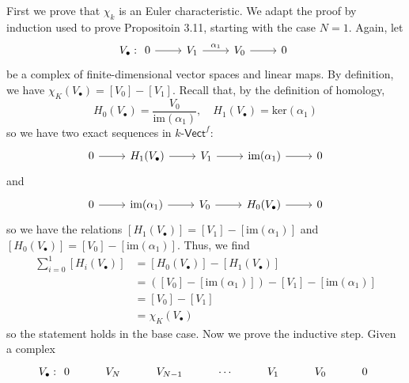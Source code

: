 \documentclass[../../master.tex]{subfiles}
\begin{document}
\begin{solution}
    First we prove that $\chi_k$ is an Euler characteristic.
    We adapt the proof by induction used to prove Propositoin 3.11, starting with the case $N = 1$.
    Again, let
	\[
        V_{\bullet}:
	\begin{tikzcd}
            0 & V_1 & V_0 & 0
	    \arrow[from=1-1, to=1-2]
	    \arrow[from=1-2, to=1-3, "\alpha_1"]
	    \arrow[from=1-3, to=1-4]
	\end{tikzcd}
	\]
        be a complex of finite-dimensional vector spaces and linear maps.
        By definition, we have $\chi_K(V_{\bullet}) = [V_0] - [V_1]$.
        Recall that, by the definition of homology,
        \[
            H_0 (V_{\bullet}) = \frac{V_0}{\text{im}(\alpha_1)}, \quad H_1 (V_{\bullet}) = \text{ker} (\alpha_1)
        \]
        so we have two exact sequences in $k\text{-}\mathsf{Vect}^{f}$:
        \[
        \begin{tikzcd}
            0 & H_1(V_{\bullet}) & V_1 & \text{im}(\alpha_1) & 0
            \arrow[from=1-1, to=1-2] 
            \arrow[from=1-2, to=1-3] 
            \arrow[from=1-3, to=1-4] 
            \arrow[from=1-4, to=1-5] 
        \end{tikzcd}
        \]
        and
        \[
        \begin{tikzcd}
            0 & \text{im}(\alpha_1) & V_0 & H_0(V_{\bullet}) & 0
            \arrow[from=1-1, to=1-2] 
            \arrow[from=1-2, to=1-3] 
            \arrow[from=1-3, to=1-4] 
            \arrow[from=1-4, to=1-5] 
        \end{tikzcd}
        \]
        so we have the relations $[H_1(V_{\bullet})] = [V_1] - [\text{im}(\alpha_1)]$ and $[H_0(V_{\bullet})] = [V_0] - [\text{im}(\alpha_1)]$.
        Thus, we find
        \begin{align*}
            \sum_{i=0}^{1} [H_i(V_{\bullet})] &= [H_0(V_{\bullet})] - [H_1(V_{\bullet})] \\
                                             &= ([V_0] - [\text{im}(\alpha_1)]) - [V_1] - [\text{im}(\alpha_1)] \\
                                             &= [V_0] - [V_1] \\
                                             &= \chi_K(V_{\bullet})
        \end{align*}
        so the statement holds in the base case.
        Now we prove the inductive step.
        Given a complex 
        \[
            V_{\bullet}:
            \begin{tikzcd}
                0 & V_N & V_{N-1} & \cdots & V_1 & V_0 & 0

\end{tikzcd}\]
\end{solution}
\end{document}

